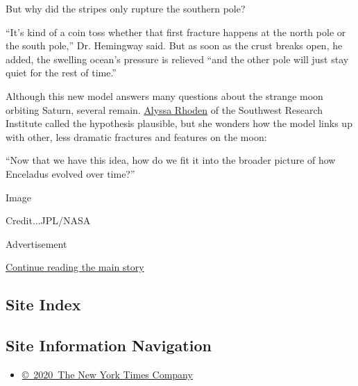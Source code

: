 But why did the stripes only rupture the southern pole?

``It's kind of a coin toss whether that first fracture happens at the
north pole or the south pole,'' Dr. Hemingway said. But as soon as the
crust breaks open, he added, the swelling ocean's pressure is relieved
``and the other pole will just stay quiet for the rest of time.''

Although this new model answers many questions about the strange moon
orbiting Saturn, several remain.
\href{http://rhodenresearch.weebly.com/}{Alyssa Rhoden} of the Southwest
Research Institute called the hypothesis plausible, but she wonders how
the model links up with other, less dramatic fractures and features on
the moon:

``Now that we have this idea, how do we fit it into the broader picture
of how Enceladus evolved over time?''

Image

Credit...JPL/NASA

Advertisement

\protect\hyperlink{after-bottom}{Continue reading the main story}

\hypertarget{site-index}{%
\subsection{Site Index}\label{site-index}}

\hypertarget{site-information-navigation}{%
\subsection{Site Information
Navigation}\label{site-information-navigation}}

\begin{itemize}
\tightlist
\item
  \href{https://help.nytimes3xbfgragh.onion/hc/en-us/articles/115014792127-Copyright-notice}{©~2020~The
  New York Times Company}
\end{itemize}

